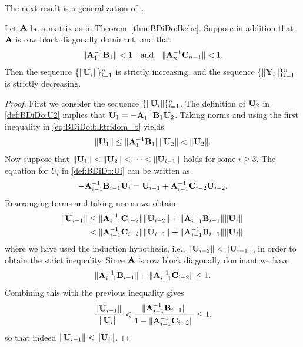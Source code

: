 The next result is a generalization of~\cite[Theorem~3.2]{Nabben99-2}.\pagebreak

\begin{lemma}\label{lem:BDiDo:sequences}
Let $\mathbf{A}$ be a matrix as in Theorem~\ref{thm:BDiDo:Ikebe}. Suppose in addition
that $\mathbf{A}$ is row block diagonally dominant, and that
%
\begin{equation}\label{eq:BDiDo:blktridom_b}
\|\mathbf{A}_1^{-1}\mathbf{B}_1\|<1 \quad\mbox{and}\quad \|\mathbf{A}_n^{-1}\mathbf{C}_{n-1}\|<1.
\end{equation}
%
Then the sequence $\{\|\mathbf{U}_i\|\}_{i=1}^n$ is strictly increasing, and the
sequence $\{\|\mathbf{Y}_i\|\}_{i=1}^n$ is strictly decreasing.
\end{lemma}

\begin{proof}
First we consider the
sequence $\{\|\mathbf{U}_i\|\}_{i=1}^n$. The definition of $\mathbf{U}_2$ in \eqref{def:BDiDo:U2}
implies that $\mathbf{U}_1=-\mathbf{A}_1^{-1}\mathbf{B}_1\mathbf{U}_2$. Taking norms and using the first
inequality in \eqref{eq:BDiDo:blktridom_b} yields
\[
\|\mathbf{U}_1\|\leq\|\mathbf{A}_1^{-1}\mathbf{B}_1\|\|\mathbf{U}_2\|<\|\mathbf{U}_2\|.
\]
Now suppose that $\|\mathbf{U}_1\|<\|\mathbf{U}_2\|<\cdots <\|\mathbf{U}_{i-1}\|$ holds for some
$i\geq 3$. The equation for $U_i$ in \eqref{def:BDiDo:Ui} can be written as
\[
 -\mathbf{A}^{-1}_{i-1}\mathbf{B}_{i-1}\mathbf{U}_i=\mathbf{U}_{i-1}+\mathbf{A}_{i-1}^{-1}\mathbf{C}_{i-2}\mathbf{U}_{i-2}.
\]
Rearranging terms and taking norms we obtain
\begin{align*}
\|\mathbf{U}_{i-1}\| &\leq\|\mathbf{A}_{i-1}^{-1}\mathbf{C}_{i-2}\|\|\mathbf{U}_{i-2}\|+\|\mathbf{A}_{i-1}^{-1}\mathbf{B}_{i-1}\|\|\mathbf{U}_{i}\|\\
&<\|\mathbf{A}_{i-1}^{-1}\mathbf{C}_{i-2}\|\|\mathbf{U}_{i-1}\|+\|\mathbf{A}_{i-1}^{-1}\mathbf{B}_{i-1}\|\|\mathbf{U}_{i}\|,
\end{align*}
where we have used the induction hypothesis, i.e., $\|\mathbf{U}_{i-2}\|<\|\mathbf{U}_{i-1}\|$,
in order to obtain the strict inequality. Since $\mathbf{A}$ is row block diagonally
dominant we have
%
\[\|\mathbf{A}_{i-1}^{-1}\mathbf{B}_{i-1}\|+ \|\mathbf{A}_{i-1}^{-1}\mathbf{C}_{i-2}\|\leq 1.\]
%
Combining this with the previous inequality gives
\[
\frac{\|\mathbf{U}_{i-1}\|}{\|\mathbf{U}_{i}\|}<\frac{\|\mathbf{A}_{i-1}^{-1}\mathbf{B}_{i-1}\|}{1-\|\mathbf{A}_{i-1}^{-1}\mathbf{C}_{i-2}\|}\leq 1,
\]
so that indeed $\|\mathbf{U}_{i-1}\|<\|\mathbf{U}_i\|$.


\end{proof}
